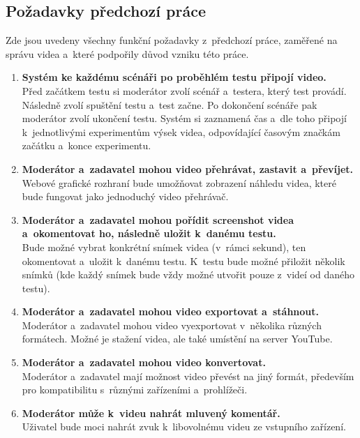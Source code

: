 \documentclass[thesis=M,czech]{FITthesis}[2012/06/26]
\begin{document}
\subsection{Požadavky předchozí práce} \label{subsec:analyza_predchozi_prace_pozadavky}
Zde jsou uvedeny všechny funkční požadavky z~předchozí práce, zaměřené na správu videa a~které podpořily důvod vzniku této práce.
\begin{enumerate}
	\item \textbf{Systém ke každému scénáři po proběhlém testu připojí video.\\}
Před začátkem testu si moderátor zvolí scénář a~testera, který test provádí. Následně zvolí spuštění testu a~test začne. Po dokončení scénáře pak moderátor zvolí ukončení testu. Systém si zaznamená čas a~dle toho připojí k~jednotlivými experimentům výsek videa, odpovídající časovým značkám začátku a~konce experimentu.

	\item \textbf{Moderátor a~zadavatel mohou video přehrávat, zastavit a~převíjet.\\}
Webové grafické rozhraní bude umožňovat zobrazení náhledu videa, které bude fungovat jako jednoduchý video přehrávač.

	\item \textbf{Moderátor a~zadavatel mohou pořídit screenshot videa a~okomentovat ho, následně uložit k~danému testu.\\}
Bude možné vybrat konkrétní snímek videa (v~rámci sekund), ten okomentovat a~uložit k~danému testu. K~testu bude možné přiložit několik snímků (kde každý snímek bude vždy možné utvořit pouze z~videí od daného testu).

	\item \textbf{Moderátor a~zadavatel mohou video exportovat a~stáhnout.\\}
Moderátor a~zadavatel mohou video vyexportovat v~několika různých formátech. Možné je stažení videa, ale také umístění na server YouTube.

	\item \textbf{Moderátor a~zadavatel mohou video konvertovat.\\}
Moderátor a~zadavatel mají možnost video převést na jiný formát, především pro kompatibilitu s~různými zařízeními a~prohlížeči.

	\item \textbf{Moderátor může k~videu nahrát mluvený komentář.\\}
Uživatel bude moci nahrát zvuk k~libovolnému videu ze vstupního zařízení.
\end{enumerate}
\end{document}
